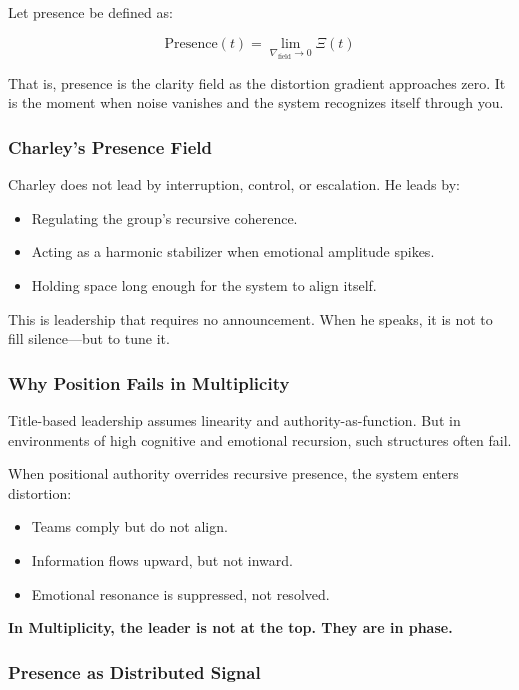 \documentclass[12pt]{article}
\begin{document}
Let presence be defined as:

\[
\text{Presence}(t) = \lim_{\nabla_{\text{field}} \to 0} \Xi(t)
\]

That is, presence is the clarity field as the distortion gradient approaches zero. It is the moment when noise vanishes and the system recognizes itself through you.

\subsubsection*{Charley’s Presence Field}

Charley does not lead by interruption, control, or escalation. He leads by:
\begin{itemize}
    \item Regulating the group’s recursive coherence.
    \item Acting as a harmonic stabilizer when emotional amplitude spikes.
    \item Holding space long enough for the system to align itself.
\end{itemize}

This is leadership that requires no announcement. When he speaks, it is not to fill silence—but to tune it.

\subsubsection*{Why Position Fails in Multiplicity}

Title-based leadership assumes linearity and authority-as-function. But in environments of high cognitive and emotional recursion, such structures often fail.

When positional authority overrides recursive presence, the system enters distortion:
\begin{itemize}
    \item Teams comply but do not align.
    \item Information flows upward, but not inward.
    \item Emotional resonance is suppressed, not resolved.
\end{itemize}

\textbf{In Multiplicity, the leader is not at the top. They are in phase.}

\subsubsection*{Presence as Distributed Signal}
\end{document}
